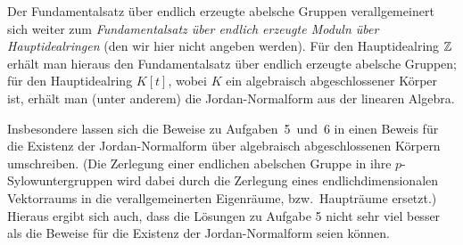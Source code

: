 \begin{remark}
  Der Fundamentalsatz über endlich erzeugte abelsche Gruppen verallgemeinert sich weiter zum \emph{Fundamentalsatz über endlich erzeugte Moduln über Hauptidealringen} (den wir hier nicht angeben werden).
  Für den Hauptidealring $\mathbb{Z}$ erhält man hieraus den Fundamentalsatz über endlich erzeugte abelsche Gruppen;
  für den Hauptidealring $K[t]$, wobei $K$ ein algebraisch abgeschlossener Körper ist, erhält man (unter anderem) die Jordan-Normalform aus der linearen Algebra.
  
  Insbesondere lassen sich die Beweise zu Aufgaben~5~und~6 in einen Beweis für die Existenz der Jordan-Normalform über algebraisch abgeschlossenen Körpern umschreiben.
  (Die Zerlegung einer endlichen abelschen Gruppe in ihre $p$-Sylowuntergruppen wird dabei durch die Zerlegung eines endlichdimensionalen Vektorraums in die verallgemeinerten Eigenräume, bzw.\ Haupträume ersetzt.)
  Hieraus ergibt sich auch, dass die Lösungen zu Aufgabe 5 nicht sehr viel besser als die Beweise für die Existenz der Jordan-Normalform seien können.
\end{remark}




